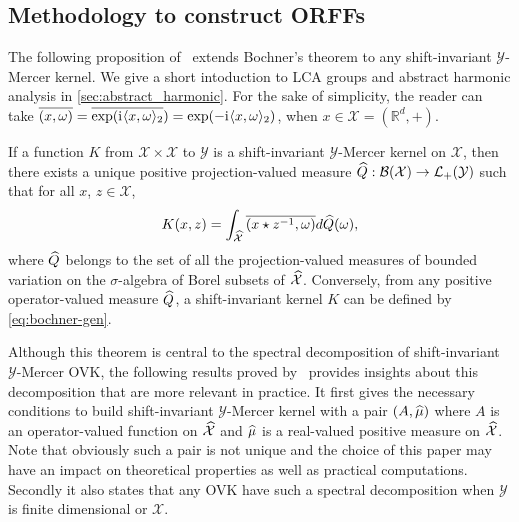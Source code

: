 \documentclass[twoside,11pt]{article}
\begin{document}
\subsection{Methodology to construct ORFFs}
\label{sec:theoretical_study}
The following proposition of~\citet{Zhang2012, neeb1998operator} extends
Bochner's theorem to any shift-invariant $\mathcal{Y}$-Mercer kernel. We give a
short intoduction to \acs{LCA} groups and abstract harmonic analysis in
\cref{sec:abstract_harmonic}. For the sake of simplicity, the reader can take
$\overline{(x,\omega)}=\overline{\exp({\mathrm{i}\mkern1mu}\langle x,
\omega\rangle_2})=\exp(-{\mathrm{i}\mkern1mu}\langle x,\omega\rangle_2)$, when $x\in\mathcal{X}=(\mathbb{R}^d,
+)$.
\begin{proposition}
    \label{pr:operator_valued_bochner}
    If a function $K$ from $\mathcal{X} \times \mathcal{X}$ to $\mathcal{Y}$ is
    a shift-invariant $\mathcal{Y}$-Mercer kernel on $\mathcal{X}$, then there
    exists a unique positive projection-valued measure $\widehat{Q}:
    \mathcal{B}(\mathcal{X}) \to
    \mathcal{L}_+(\mathcal{Y})$ such that for all $x$, $z \in \mathcal{X}$,
    \begin{dmath}
        \label{eq:bochner-gen}
        K(x, z) = \int_{\dual{\mathcal{X}}} \conj{\pairing{x \groupop \inv{z},
        \omega}} d\dual{Q}(\omega),
    \end{dmath}
    where $\widehat{Q}$ belongs to the set of all the projection-valued measures
    of bounded variation on the $\sigma$-algebra of Borel subsets of
    $\widehat{\mathcal{X}}$. Conversely, from any positive operator-valued measure
    $\widehat{Q}$, a shift-invariant kernel $K$ can be defined by
    \cref{eq:bochner-gen}.
\end{proposition}
Although this theorem is central to the spectral decomposition of
shift-invariant $\mathcal{Y}$-Mercer \acs{OVK}, the following results proved
by~\citet{Carmeli2010} provides insights about this decomposition that are more
relevant in practice. It first gives the necessary conditions to build
shift-invariant $\mathcal{Y}$-Mercer kernel with a pair $(A, \widehat{\mu})$ where
$A$ is an operator-valued function on $\widehat{\mathcal{X}}$ and $\widehat{\mu}$ is
a real-valued positive measure on $\widehat{\mathcal{X}}$. Note that obviously
such a pair is not unique and the choice of this paper may have an impact on
theoretical properties as well as practical computations.  Secondly it also
states that any \acs{OVK} have such a spectral decomposition when $\mathcal{Y}$
is finite dimensional or $\mathcal{X}$.
\end{document}
